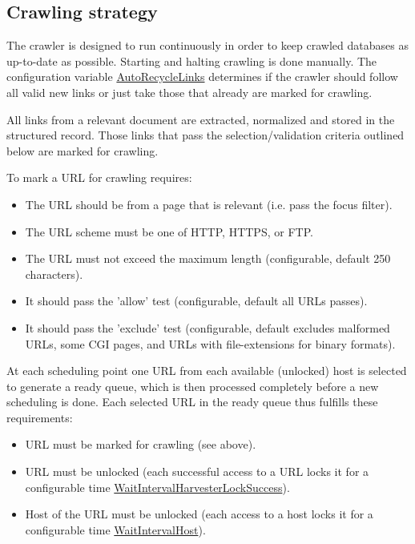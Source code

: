 \subsection{Crawling strategy}
\label{sched}
The crawler is designed to run continuously in order to keep
crawled databases as up-to-date as possible.
Starting and halting crawling is done manually.
The configuration variable \hyperref{AutoRecycleLinks}{AutoRecycleLinks (section }{)}{AutoRecycleLinks} determines if the crawler should
follow all valid new links or just take those that already are
marked for crawling.

All links from a relevant document are extracted, normalized and stored
in the structured record. Those links that pass the selection/validation
criteria outlined below are marked for crawling.

\hspace{-\parindent}To mark a URL for crawling requires:
\begin{itemize}
\item The URL should be from a page that is relevant (i.e. pass the focus filter).
\item The URL scheme must be one of HTTP, HTTPS, or FTP.
\item The URL must not exceed the maximum length (configurable, default 250 characters).
\item It should pass the 'allow' test (configurable, default all URLs passes).
\item It should pass the 'exclude' test (configurable, default excludes malformed URLs, some CGI pages, and URLs with file-extensions for binary formats).
\end{itemize}

At each scheduling point one URL from each available (unlocked) host is selected to 
generate a ready queue, which is then processed completely 
before a new scheduling is done.
Each selected URL in the ready queue thus fulfills these requirements:
\begin{itemize}
\item URL must be marked for crawling (see above).
\item URL must be unlocked (each successful access to a URL locks it for
a configurable time \hyperref{WaitIntervalHarvesterLockSuccess}{WaitIntervalHarvesterLockSuccess (section }{)}{WaitIntervalHarvesterLockSuccess}).
\item Host of the URL must be unlocked (each access to a host locks it for a configurable time \hyperref{WaitIntervalHost}{WaitIntervalHost (section }{)}{WaitIntervalHost}).
\end{itemize}


